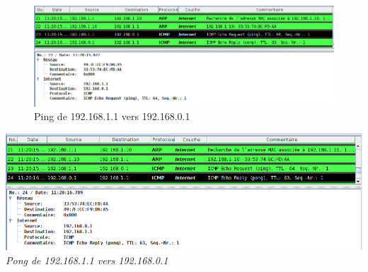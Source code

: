 \documentclass[
  11pt,
]{article}
\begin{document}
\begin{figure}
\centering
\includegraphics{images/ping_wlan.png}
\caption{Ping de 192.168.1.1 vers 192.168.0.1}
\end{figure}

\includegraphics{images/pong_wlan.png}\\

\emph{Pong de 192.168.1.1 vers 192.168.0.1}
\end{document}
